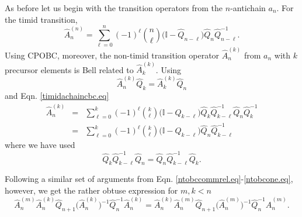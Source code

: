 \documentclass[11pt]{article}
\newcommand{\hA}{\hat { A}}
\newcommand{\hQ}{\hat Q}
\newcommand{\achain}{a}
\newcommand{\id}{\mathbb I}
\newcommand{\h}{\hat}
\begin{document}
As before let us begin with the transition operators from the
$n$-antichain $\achain_n$.  For the timid transition, 
\begin{equation}
\h A_n^{(n)}= \sum_{\ell=0}^n (-1)^{\ell} \binom{n}{\ell}
\biggl(\id - \hQ_{n-\ell}\biggr) \hQ_n \hQ_{n-\ell}^{-1}.   \label{timidachaincbc.eq}
\end{equation} 
Using CPOBC, moreover, the non-timid transition operator 
$\hA_n^{(k)}$  from $\achain_n$ with $k$ precursor elements is Bell
related to $\h A_k^{(k)}$. Using 
\begin{equation}
\hA_n^{(k)}\hQ_k=\h A_k^{(k)}\hQ_n 
\end{equation} 
and Eqn. \eqref{timidachaincbc.eq}
\begin{eqnarray} 
\hA_n^{(k)} & = &  \sum_{\ell=0}^{k} (-1)^{\ell} \binom{k}{\ell}
\biggl(\id - \hQ_{k-\ell}\biggr) \hQ_k \hQ_{k-\ell}^{-1} \hQ_n
                  \hQ_k^{-1}  \nonumber \\
&=& \sum_{\ell=0}^{k} (-1)^{\ell} \binom{k}{\ell}
\biggl(\id - \hQ_{k-\ell}\biggr) \hQ_n
    \hQ_{k-\ell}^{-1} \label{ankcpobc.eq} 
\end{eqnarray} 
where we have used
\begin{equation}
\hQ_k \hQ_{k-\ell}^{-1} \hQ_n = \hQ_n\hQ_{k-\ell}^{-1} \hQ_k. 
  \end{equation} 

Following a similar set of arguments from
Eqn. \eqref{ntobccommrel.eq}-\eqref{ntobcone.eq}, however, we get the
rather obtuse expression for $m,k<n$ 
\begin{equation}
\hA_n^{(m)}\hA_n^{(k)} \hQ_{n+1} \biggl(\hA_n^{(k)}\biggr)^{-1}
\hQ_n^{-1} \hA_n^{(k)} =\hA_n^{(k)}\hA_n^{(m)} \hQ_{n+1} \biggl(\hA_n^{(m)}\biggr)^{-1}
\hQ_n^{-1} \hA_n^{(m)}.  \label{cpobc.eq}
\end{equation} 
\end{document}
